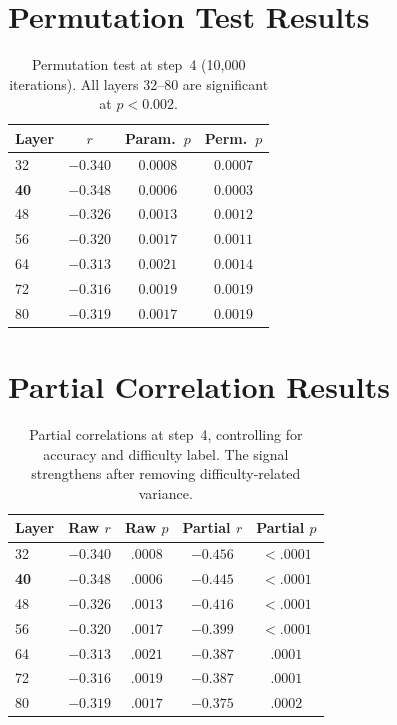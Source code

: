 \documentclass{article}
\begin{document}
\section{Permutation Test Results}
\label{app:permutation}

\begin{table}[ht]
\caption{Permutation test at step~4 (10{,}000 iterations). All layers 32--80 are significant at $p < 0.002$.}
\label{tab:permutation}
\centering
\small
\begin{tabular}{lccc}
\toprule
Layer & $r$ & Param.\ $p$ & Perm.\ $p$ \\
\midrule
32 & $-0.340$ & $0.0008$ & $0.0007$ \\
\textbf{40} & $\mathbf{-0.348}$ & $\mathbf{0.0006}$ & $\mathbf{0.0003}$ \\
48 & $-0.326$ & $0.0013$ & $0.0012$ \\
56 & $-0.320$ & $0.0017$ & $0.0011$ \\
64 & $-0.313$ & $0.0021$ & $0.0014$ \\
72 & $-0.316$ & $0.0019$ & $0.0019$ \\
80 & $-0.319$ & $0.0017$ & $0.0019$ \\
\bottomrule
\end{tabular}
\end{table}

\section{Partial Correlation Results}
\label{app:partial}

\begin{table}[ht]
\caption{Partial correlations at step~4, controlling for accuracy and difficulty label. The signal strengthens after removing difficulty-related variance.}
\label{tab:partial}
\centering
\small
\begin{tabular}{lcccc}
\toprule
Layer & Raw $r$ & Raw $p$ & Partial $r$ & Partial $p$ \\
\midrule
32 & $-0.340$ & $.0008$ & $-0.456$ & $< .0001$ \\
\textbf{40} & $\mathbf{-0.348}$ & $\mathbf{.0006}$ & $\mathbf{-0.445}$ & $\mathbf{< .0001}$ \\
48 & $-0.326$ & $.0013$ & $-0.416$ & $< .0001$ \\
56 & $-0.320$ & $.0017$ & $-0.399$ & $< .0001$ \\
64 & $-0.313$ & $.0021$ & $-0.387$ & $.0001$ \\
72 & $-0.316$ & $.0019$ & $-0.387$ & $.0001$ \\
80 & $-0.319$ & $.0017$ & $-0.375$ & $.0002$ \\
\bottomrule
\end{tabular}
\end{table}
\end{document}
